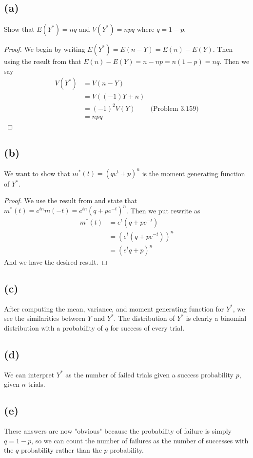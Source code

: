 \documentclass{article}
\begin{document}
    \subsection*{(a)}
        Show that $E(Y^*) = nq$ and $V(Y^*) = npq$ where $q = 1 - p$.
        \begin{proof}
            We begin by writing $E(Y^*) = E(n - Y) = E(n) - E(Y)$. Then using the result from
              that $E(n) - E(Y) = n - np = n(1-p) = nq$. 
            Then we say 
            \begin{align*}
                V(Y^*) &= V(n - Y) \\
                &= V((-1)Y + n) \\
                &= (-1)^2V(Y) & \text{(Problem 3.159)}\\
                &= npq
            \end{align*}
        \end{proof}
    \subsection*{(b)}
        We want to show that $m^*(t) = (qe^t+p)^n$ is the moment generating function of $Y^*$.
        \begin{proof}
            We use the result from  and state that $m^*(t) = e^{t n} m(-t) = e^{t n}(q+pe^{-t})^n$.
            Then we put rewrite as
            \begin{align*}
                m^*(t) &= e^t(q+pe^{-t}) \\
                &= (e^t(q+pe^{-t}))^n \\
                &= (e^t q + p) ^n
            \end{align*}
            And we have the desired result.
        \end{proof} 
    \subsection*{(c)}
        After computing the mean, variance, and moment generating function for $Y^*$, we see the similarities
        between $Y$ and $Y^*$.
        The distribution of $Y^*$ is clearly a binomial distribution with a probability of $q$ 
        for success of every trial.
    \subsection*{(d)}
        We can interpret $Y^*$ as the number of failed trials given a success probability $p$,
        given $n$ trials.
    \subsection*{(e)}
        These answers are now "obvious" because the probability of failure is simply $q = 1 - p$,
        so we can count the number of failures as the number of successes with the $q$ probability
        rather than the $p$ probability.
\end{document}
